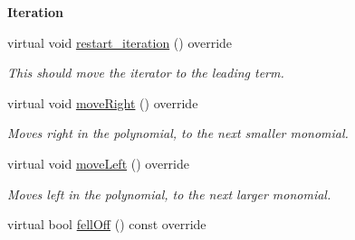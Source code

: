 \begin{Indent}\textbf{ Iteration}\par
\begin{DoxyCompactItemize}
\item 
\mbox{\label{group___iterator_group_a039b9076a97e27d93c2393509024c6a3}} 
virtual void \hyperlink{group___iterator_group_a039b9076a97e27d93c2393509024c6a3}{restart\+\_\+iteration} () override
\begin{DoxyCompactList}\small\item\em This should move the iterator to the leading term. \end{DoxyCompactList}\item 
\mbox{\label{group___iterator_group_ae7570f0ac60c11fe8cddc6ba6e1028a9}} 
virtual void \hyperlink{group___iterator_group_ae7570f0ac60c11fe8cddc6ba6e1028a9}{move\+Right} () override
\begin{DoxyCompactList}\small\item\em Moves right in the polynomial, to the next smaller monomial. \end{DoxyCompactList}\item 
\mbox{\label{group___iterator_group_a7a2a49f383c6a7c466c107648940bfcf}} 
virtual void \hyperlink{group___iterator_group_a7a2a49f383c6a7c466c107648940bfcf}{move\+Left} () override
\begin{DoxyCompactList}\small\item\em Moves left in the polynomial, to the next larger monomial. \end{DoxyCompactList}\item 
virtual bool \hyperlink{group___iterator_group_a4c7718296e7be3e5c2b942fa71dd69f2}{fell\+Off} () const override
\end{DoxyCompactItemize}
\end{Indent}
